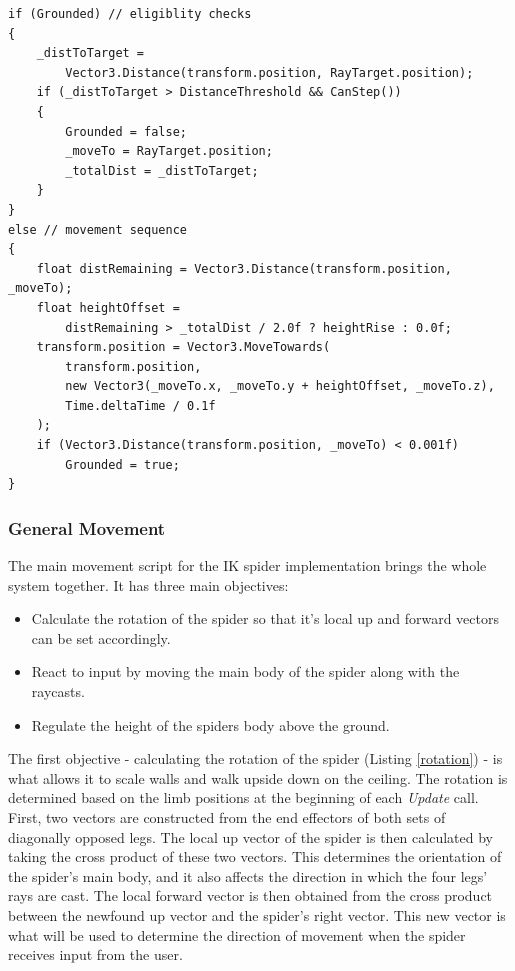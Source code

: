 \begin{lstlisting}[basicstyle=\linespread{0.9}\footnotesize\ttfamily, numbers=none,frame=single,
caption={The script's \textit{Update} method which contains eligibility checks
and execution logic for the leg target's movement sequence.
\textit{TargetLogic.cs}},captionpos=t, label=target_move, language={[Sharp]c},
float=tp]
if (Grounded) // eligiblity checks
{
    _distToTarget = 
        Vector3.Distance(transform.position, RayTarget.position);
    if (_distToTarget > DistanceThreshold && CanStep())
    {
        Grounded = false;
        _moveTo = RayTarget.position;
        _totalDist = _distToTarget;
    }
}
else // movement sequence
{
    float distRemaining = Vector3.Distance(transform.position, _moveTo);
    float heightOffset =
        distRemaining > _totalDist / 2.0f ? heightRise : 0.0f;
    transform.position = Vector3.MoveTowards(
        transform.position,
        new Vector3(_moveTo.x, _moveTo.y + heightOffset, _moveTo.z),
        Time.deltaTime / 0.1f
    );
    if (Vector3.Distance(transform.position, _moveTo) < 0.001f)
        Grounded = true;
}
\end{lstlisting}

\subsubsection{General Movement}
The main movement script for the IK spider implementation brings the whole
system together. It has three main objectives:

\begin{itemize}

    \item Calculate the rotation of the spider so that it's local up and forward
        vectors can be set accordingly.

    \item React to input by moving the main body of the spider along with the
        raycasts.

    \item Regulate the height of the spiders body above the ground.

\end{itemize}

The first objective - calculating the rotation of the spider (Listing
\ref{rotation}) - is what allows it to scale walls and walk upside down on the
ceiling. The rotation is determined based on the limb positions at the beginning
of each \textit{Update} call. First, two vectors are constructed from the end
effectors of both sets of diagonally opposed legs. The local up vector of the
spider is then calculated by taking the cross product of these two vectors. This
determines the orientation of the spider's main body, and it also affects the
direction in which the four legs' rays are cast. The local forward vector is
then obtained from the cross product between the newfound up vector and the
spider's right vector. This new vector is what will be used to determine the
direction of movement when the spider receives input from the user.


